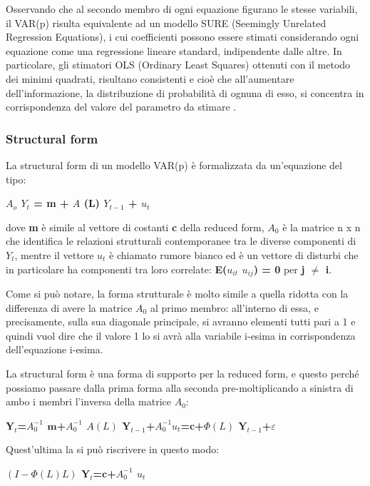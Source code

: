 \documentclass[12pt,a4paper,oneside,openright]{book}
\begin{document}
Osservando che al secondo membro di ogni equazione figurano le stesse variabili, il VAR(p) risulta equivalente ad un modello SURE (Seemingly Unrelated Regression Equations), i cui coefficienti possono essere stimati considerando ogni equazione come una regressione lineare standard, indipendente dalle altre. In particolare, gli stimatori OLS (Ordinary Least Squares) ottenuti con il metodo dei minimi quadrati, risultano consistenti e cioè che all'aumentare dell'informazione, la distribuzione di probabilità di ognuna di esso, si concentra in corrispondenza del valore del parametro da stimare \cite{11a}.
\subsubsection{Structural form}
La structural form di un modello VAR(p) è formalizzata da un'equazione del tipo:
\begin{center}
{\bfseries 
$A_o$ $Y_t$ = m + $A$ (L) $Y_{t-1}$ + $u_t$
}
\end{center}
dove {\bfseries m} è simile al vettore di costanti {\bfseries c} della reduced form, {\bfseries $A_0$} è la matrice n x n che identifica le relazioni strutturali contemporanee tra le diverse componenti di {\bfseries $Y_t$}, mentre il vettore {\bfseries $u_t$} è chiamato rumore bianco ed è un vettore di disturbi che in particolare ha componenti tra loro correlate: {\bfseries E($u_{it}$ $u_{ij}$) = 0} per {\bfseries j $\neq$ i}.

Come si può notare, la forma strutturale è molto simile a quella ridotta con la differenza di avere la matrice $A_0$ al primo membro: all'interno di essa, e precisamente, sulla sua diagonale principale, si avranno elementi tutti pari a 1 e quindi vuol dire che il valore 1 lo si avrà alla variabile i-esima in corrispondenza dell'equazione i-esima. 

La structural form è una forma di supporto per la reduced form, e questo perché possiamo passare dalla prima forma alla seconda pre-moltiplicando a sinistra di ambo i membri l'inversa della matrice $A_0$:
\begin{center}
{\bfseries
$\mathbf{Y}_t$=$A_0^{-1}$ $\mathbf{m}$+$A_0^{-1}$ $A(L)$ $\mathbf{Y}_{t-1}$+$A_0^{-1}u_t$=$\mathbf{c}$+$\Phi(L)$ $\mathbf{Y}_{t-1}$+$\varepsilon$
}
\end{center}

Quest'ultima la si può riscrivere in questo modo:
\begin{center}
{\bfseries
$\left(I-\Phi(L)L\right)$ $\mathbf{Y}_t$=$\mathbf{c}$+$A_0^{-1}$ $u_t$
}
\end{center}
\end{document}
